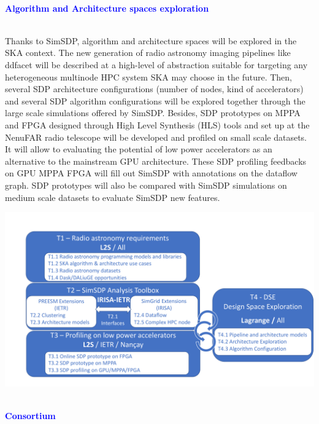 \documentclass{beamer}
\renewenvironment{block}[1]{%
\begin{Sbox}%
\begin{minipage}[t]{\textwidth}
~\\
\textcolor{blue}{\quad #1}~\\
~\\%
\vspace{0.5cm}
} 
{%
\end{minipage}
\end{Sbox}\Ovalbox{\TheSbox}%
}
\begin{document}
{\begin{columns}[t]
\begin{column}{.49\linewidth}
\begin{block}{\large \textbf{Algorithm and Architecture spaces exploration}}
        \begin{minipage}{0.95\textwidth}
Thanks to SimSDP, algorithm and architecture spaces will be explored in the SKA context. The new generation of radio astronomy imaging pipelines like ddfacet will be described at a high-level of abstraction suitable for targeting any heterogeneous multinode HPC system SKA may choose in the future. Then, several SDP architecture configurations (number of nodes, kind of accelerators) and several SDP algorithm configurations will be explored together through the large scale simulations offered by SimSDP. Besides, SDP prototypes on MPPA and FPGA designed through High Level Synthesis (HLS) tools and set up at the NenuFAR radio telescope will be developed and profiled on small scale datasets. It will allow to evaluating the potential of low power accelerators as an alternative to the mainstream GPU architecture. These SDP profiling feedbacks on GPU MPPA FPGA will fill out SimSDP with annotations on the dataflow graph. SDP prototypes will also be compared with SimSDP simulations on medium scale datasets to evaluate SimSDP new features.\\


 
 \begin{center}
    \includegraphics[width=\textwidth ]{Tasks} %
    \end{center}




\end{minipage}

\end{block}

\begin{block}{\large \textbf{Consortium}}
 

\end{block}
\end{column}
\end{columns}}
\end{document}

